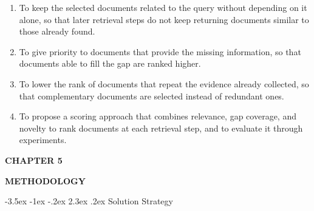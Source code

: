 \documentclass[12pt,a4paper]{report}
\makeatletter
\renewcommand\section{\@startsection{section}{1}{\z@}%
    {-3.5ex \@plus -1ex \@minus -.2ex}%
    {2.3ex \@plus.2ex}%
    {\normalfont\fontsize{16}{19}\selectfont\bfseries}}
\newcommand{\chaptertitle}[2]{
    \begin{flushright}
        {\fontsize{22}{26}\selectfont\bfseries CHAPTER #1\par}
        \vspace{0.10in}
        {\fontsize{22}{26}\selectfont\bfseries #2\par}
    \end{flushright}
    \vspace{0.12in}
}
\makeatother
\begin{document}
\begin{enumerate}[leftmargin=0.30in,itemsep=0.12in,parsep=0pt]

\item
To keep the selected documents related to the query without depending on it alone, so that later retrieval steps do not keep returning documents similar to those already found.

\item
To give priority to documents that provide the missing information, so that documents able to fill the gap are ranked higher.

\item
To lower the rank of documents that repeat the evidence already collected, so that complementary documents are selected instead of redundant ones.

\item
To propose a scoring approach that combines relevance, gap coverage, and novelty to rank documents at each retrieval step, and to evaluate it through experiments.

\end{enumerate}
\clearpage





\setcounter{table}{0}
\renewcommand{\thetable}{5.\arabic{table}}
\renewcommand{\theHtable}{chapter5.\arabic{table}}
\setcounter{figure}{0}
\renewcommand{\thefigure}{5.\arabic{figure}}
\renewcommand{\theHfigure}{chapter5.\arabic{figure}}
\setcounter{chapter}{5}
\setcounter{section}{0}
\setcounter{subsection}{0}


\chaptertitle{5}{METHODOLOGY}
\label{ch:5}

\section{Solution Strategy}
\end{document}
